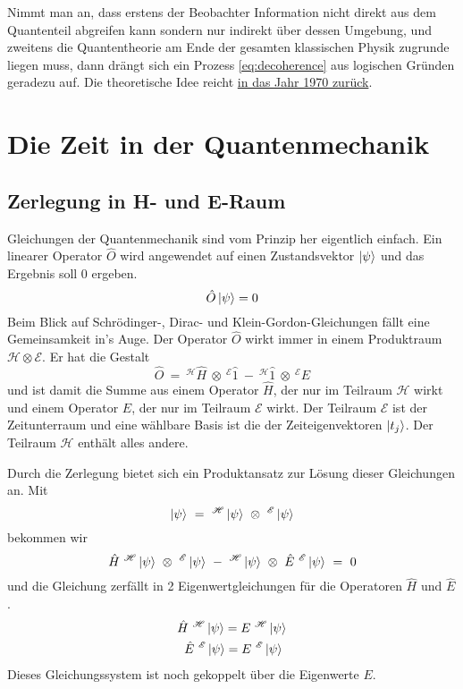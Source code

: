 \documentclass[12pt]{article}
\begin{document}
Nimmt man an, dass erstens der Beobachter Information nicht direkt aus dem Quantenteil abgreifen kann sondern nur indirekt über dessen Umgebung, und zweitens die Quantentheorie am Ende der gesamten klassischen Physik zugrunde liegen muss, dann drängt sich ein Prozess \eqref{eq:decoherence} aus logischen Gründen geradezu auf. Die theoretische Idee reicht \href{https://de.wikipedia.org/wiki/Dieter_Zeh}{in das Jahr 1970 zurück}.
 

\section{Die Zeit in der Quantenmechanik}
\subsection{Zerlegung in H- und E-Raum}
Gleichungen der Quantenmechanik sind vom Prinzip her eigentlich einfach. Ein linearer Operator $\hat{O}$ wird angewendet auf einen Zustandsvektor $\ket{\psi}$ und das Ergebnis soll $0$ ergeben.
\begin{equation*} 
\hat{O}\ket{\psi} = 0 
\end{equation*}
Beim Blick auf Schrödinger-, Dirac- und Klein-Gordon-Gleichungen fällt eine Gemeinsamkeit in's Auge. Der Operator $\hat{O}$ wirkt immer in einem Produktraum $\mathscr{H} \otimes \mathscr{E}$. Er hat die Gestalt 
\begin{equation*} 
\hat{O}\ =\ ^\mathscr{H}\hat{H}\ \otimes\ ^\mathscr{E}\hat{1}\ -\ ^\mathscr{H}\hat{1}\ \otimes\ ^\mathscr{E}\hat{E}
\end{equation*}
und ist damit die Summe aus einem Operator $\hat{H}$, der nur im Teilraum $\mathscr{H}$ wirkt und einem Operator $\hat{E}$, der nur im Teilraum $\mathscr{E}$ wirkt. Der Teilraum $\mathscr{E}$ ist der Zeitunterraum und eine wählbare Basis ist die der Zeiteigenvektoren $\ket{t_j}$. Der Teilraum $\mathscr{H}$ enthält alles andere.

Durch die Zerlegung bietet sich ein Produktansatz zur Lösung dieser Gleichungen an. Mit
\begin{equation*} 
\ket{\psi}\ =\ ^\mathscr{H}\ket{\psi}\ \otimes\ ^\mathscr{E}\ket{\psi}
\end{equation*}
bekommen wir
\begin{equation} 
\label{eq:productspace}
\hat{H}\ ^\mathscr{H}\ket{\psi}\ \otimes\ ^\mathscr{E}\ket{\psi}
\ - \ 
^\mathscr{H}\ket{\psi}\ \otimes\ \hat{E}\ ^\mathscr{E}\ket{\psi} \ =\ 0
\end{equation}
und die Gleichung zerfällt in 2 Eigenwertgleichungen für die Operatoren $\hat{H}$ und $\hat{E}$.
\begin{equation}
\label{eq:system}
\begin{split}
\hat{H}\ ^\mathscr{H}\ket{\psi} = E\ ^\mathscr{H}\ket{\psi}\\
\hat{E}\ ^\mathscr{E}\ket{\psi} = E\ ^\mathscr{E}\ket{\psi}\ 
\end{split}
\end{equation}
Dieses Gleichungssystem ist noch gekoppelt über die Eigenwerte $E$. 
\end{document}
